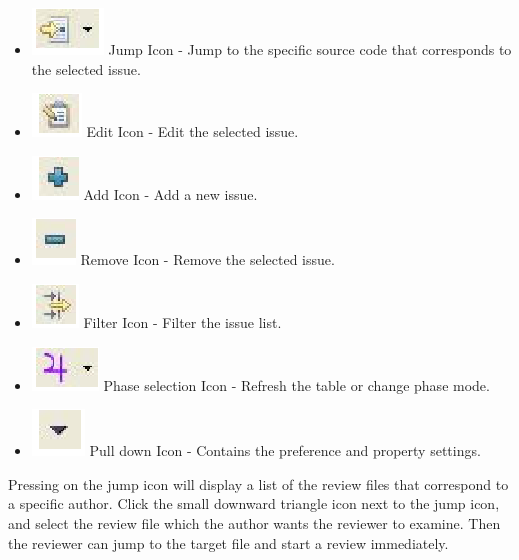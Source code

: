 \begin{itemize}
	\item \includegraphics{images/fig3-17.eps} Jump Icon - Jump to the specific source code that corresponds to the selected issue.
  \item \includegraphics{images/fig3-18.eps} Edit Icon - Edit the selected issue.
  \item \includegraphics{images/fig3-19.eps} Add Icon - Add a new issue.
  \item \includegraphics{images/fig3-20.eps} Remove Icon - Remove the selected issue.
  \item \includegraphics{images/fig3-21.eps} Filter Icon - Filter the issue list.
  \item \includegraphics{images/fig3-22.eps} Phase selection Icon - Refresh the table or change phase mode.
  \item \includegraphics{images/fig3-23.eps} Pull down Icon - Contains the preference and property settings.
\end{itemize}

Pressing on the jump icon will display a list of the review files that correspond to a specific author. Click the small downward triangle icon next to the jump icon, and select the review file which the author wants the reviewer to examine. Then the reviewer can jump to the target file and start a review immediately.

